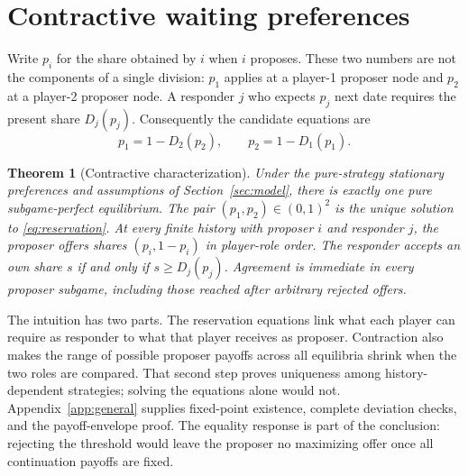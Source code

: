 \documentclass[11pt]{article}
\newtheorem{theorem}{Theorem}
\begin{document}
\section{Contractive waiting preferences}\label{sec:general}
Write $p_i$ for the share obtained by $i$ when $i$ proposes. These two numbers are not the components of a single division: $p_1$ applies at a player-1 proposer node and $p_2$ at a player-2 proposer node. A responder $j$ who expects $p_j$ next date requires the present share $D_j(p_j)$. Consequently the candidate equations are
\begin{equation}\label{eq:reservation}
 p_1=1-D_2(p_2),\qquad p_2=1-D_1(p_1).
\end{equation}

\begin{theorem}[Contractive characterization]\label{th:general}
Under the pure-strategy stationary preferences and assumptions of Section~\ref{sec:model}, there is exactly one pure subgame-perfect equilibrium. The pair $(p_1,p_2)\in(0,1)^2$ is the unique solution to \eqref{eq:reservation}. At every finite history with proposer $i$ and responder $j$, the proposer offers shares $(p_i,1-p_i)$ in player-role order. The responder accepts an own share $s$ if and only if $s\ge D_j(p_j)$. Agreement is immediate in every proposer subgame, including those reached after arbitrary rejected offers.
\end{theorem}

The intuition has two parts. The reservation equations link what each player can require as responder to what that player receives as proposer. Contraction also makes the range of possible proposer payoffs across all equilibria shrink when the two roles are compared. That second step proves uniqueness among history-dependent strategies; solving the equations alone would not. Appendix~\ref{app:general} supplies fixed-point existence, complete deviation checks, and the payoff-envelope proof. The equality response is part of the conclusion: rejecting the threshold would leave the proposer no maximizing offer once all continuation payoffs are fixed.
\end{document}
